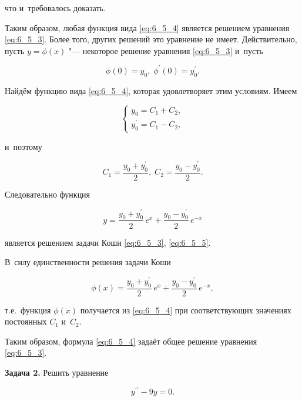 \noindent
что и~требовалось доказать.

Таким образом, любая функция вида \eqref{eq:6_5_4} является решением уравнения
\eqref{eq:6_5_3}. Более того, других решений это уравнение не имеет.
Действительно, пусть $y = \phi(x)$ "--- некоторое решение уравнения \eqref{eq:6_5_3}
и~пусть

\begin{equation}\label{eq:6_5_5}
\phi(0) = y_{0}, \; \phi^{\prime} (0) = y^{\prime}_{0}.
\end{equation}

Найдём функцию вида \eqref{eq:6_5_4}, которая удовлетворяет этим условиям.
Имеем

\begin{equation*}
\begin{cases}
y_{0} = C_{1} + C_{2}, \\
y^{\prime}_{0} = C_{1} - C_{2},
\end{cases}
\end{equation*}

\noindent
и~поэтому

\begin{equation*}
C_{1} = \dfrac{y_{0} + y^{\prime}_{0}}{2}, \; C_{2} = \dfrac{y_{0} - y^{\prime}_{0}}{2}.
\end{equation*}

Следовательно функция

\begin{equation*}
y = \dfrac{y_{0} + y^{\prime}_{0}}{2} \, e^{x} + \dfrac{y_{0} - y^{\prime}_{0}}{2} \, e^{-x}
\end{equation*}

\noindent
является решением задачи Коши \eqref{eq:6_5_3}, \eqref{eq:6_5_5}.

В~силу единственности решения задачи Коши

\begin{equation*}
\phi (x) =
\dfrac{y_{0} + y^{\prime}_{0}}{2} \, e^{x} +
\dfrac{y_{0} - y^{\prime}_{0}}{2} \, e^{-x},
\end{equation*}

\noindent
т.е.\ функция $\phi(x)$ получается из \eqref{eq:6_5_4} при соответствующих значениях
постоянных $C_{1}$ и~$C_{2}$.

Таким образом, формула \eqref{eq:6_5_4} задаёт общее решение уравнения \eqref{eq:6_5_3}.

\textbf{Задача 2.}\label{ex:6_5_2} Решить уравнение

\begin{equation}\label{eq:6_5_6}
y^{\prime\prime} - 9y = 0.
\end{equation}

